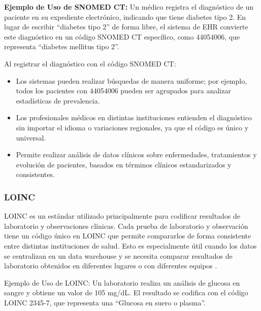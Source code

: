 \documentclass[12pt, a4paper, twoside]{article}
\begin{document}
	\textbf{Ejemplo de Uso de SNOMED CT:} Un médico registra el diagnóstico de un paciente en su expediente electrónico, indicando que tiene diabetes tipo 2. En lugar de escribir “diabetes tipo 2” de forma libre, el sistema de EHR convierte este diagnóstico en un código SNOMED CT específico, como 44054006, que representa “diabetes mellitus tipo 2”\cite{bioportalSNOMEDCT}.
	
	Al registrar el diagnóstico con el código SNOMED CT:
	
	\begin{itemize}
		\item Los sistemas pueden realizar búsquedas de manera uniforme; por ejemplo, todos los pacientes con 44054006 pueden ser agrupados para analizar estadísticas de prevalencia.
		
		\item Los profesionales médicos en distintas instituciones entienden el diagnóstico sin importar el idioma o variaciones regionales, ya que el código es único y universal.
		
		\item Permite realizar análisis de datos clínicos sobre enfermedades, tratamientos y evolución de pacientes, basados en términos clínicos estandarizados y consistentes.
	\end{itemize}
	
	\subsubsection{LOINC}
	
	LOINC es un estándar utilizado principalmente para codificar resultados de laboratorio y observaciones clínicas. Cada prueba de laboratorio y observación tiene un código único en LOINC que permite compararlos de forma consistente entre distintas instituciones de salud. Esto es especialmente útil cuando los datos se centralizan en un data warehouse y se necesita comparar resultados de laboratorio obtenidos en diferentes lugares o con diferentes equipos \cite{meditecsInteroperabilidad}.
	
	Ejemplo de Uso de LOINC: Un laboratorio realiza un análisis de glucosa en sangre y obtiene un valor de 105 mg/dL. El resultado se codifica con el código LOINC 2345-7, que representa una “Glucosa en suero o plasma”\cite{loinc2345}.
	
\end{document}

